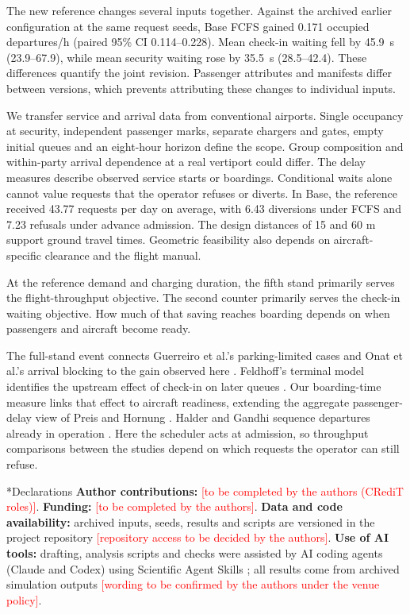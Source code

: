 \documentclass[12pt,a4paper]{article}
\makeatletter
\newcommand{\pendente}[1]{\textcolor{red}{[#1]}}
\renewcommand\section{\@startsection{section}{1}{\z@}{12pt}{4pt}{\fontsize{14}{20}\selectfont\bfseries}}
\makeatother
\begin{document}
The new reference changes several inputs together. Against the archived earlier configuration at the same request seeds, Base FCFS gained 0.171 occupied departures/h (paired 95\% CI 0.114--0.228). Mean check-in waiting fell by 45.9~s (23.9--67.9), while mean security waiting rose by 35.5~s (28.5--42.4). These differences quantify the joint revision. Passenger attributes and manifests differ between versions, which prevents attributing these changes to individual inputs.

We transfer service and arrival data from conventional airports. Single occupancy at security, independent passenger marks, separate chargers and gates, empty initial queues and an eight-hour horizon define the scope. Group composition and within-party arrival dependence at a real vertiport could differ. The delay measures describe observed service starts or boardings. Conditional waits alone cannot value requests that the operator refuses or diverts. In Base, the reference received 43.77 requests per day on average, with 6.43 diversions under FCFS and 7.23 refusals under advance admission. The design distances of 15 and 60 m support ground travel times. Geometric feasibility also depends on aircraft-specific clearance and the flight manual.

\section{Conclusions}
\label{sec:conclusion}
At the reference demand and charging duration, the fifth stand primarily serves the flight-throughput objective. The second counter primarily serves the check-in waiting objective. How much of that saving reaches boarding depends on when passengers and aircraft become ready.

The full-stand event connects Guerreiro et al.'s parking-limited cases and Onat et al.'s arrival blocking to the gain observed here \cite{guerreiro2020,onat2026buffer}. Feldhoff's terminal model identifies the upstream effect of check-in on later queues \cite{feldhoff2022}. Our boarding-time measure links that effect to aircraft readiness, extending the aggregate passenger-delay view of Preis and Hornung \cite{preisHornung2022}. Halder and Gandhi sequence departures already in operation \cite{halderGandhi2025}. Here the scheduler acts at admission, so throughput comparisons between the studies depend on which requests the operator can still refuse.

\section*{Declarations}
\textbf{Author contributions:} \pendente{to be completed by the authors (CRediT roles)}.
\textbf{Funding:} \pendente{to be completed by the authors}.
\textbf{Data and code availability:} archived inputs, seeds, results and scripts are versioned in
the project repository \pendente{repository access to be decided by the authors}.
\textbf{Use of AI tools:} drafting, analysis scripts and checks were assisted by AI coding agents
(Claude and Codex) using Scientific Agent Skills \cite{kassis2026skills}; all results come from
archived simulation outputs \pendente{wording to be confirmed by the authors under the venue
policy}.
\end{document}
